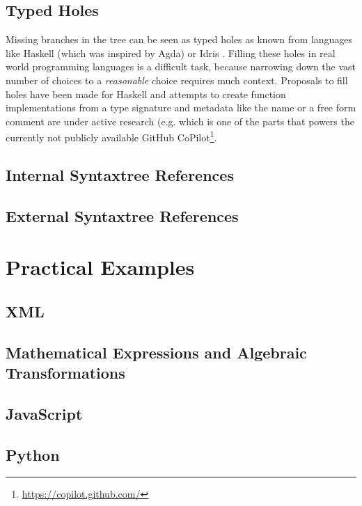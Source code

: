 \subsection{Typed Holes}

Missing branches in the tree can be seen as typed holes as known from languages like Haskell (which was inspired by Agda) \cite{jones_haskell_2014} or Idris \cite{brady_type-driven_2017}. Filling these holes in real world programming languages is a difficult task, because narrowing down the vast number of choices to a \textit{reasonable} choice requires much context. Proposals to fill holes have been made for Haskell \cite{gissurarson_suggesting_2018} and attempts to create function implementations from a type signature and metadata like the name or a free form comment are under active research (e.g. \cite{chen_evaluating_2021} which is one of the parts that powers the currently not publicly available GitHub CoPilot\footnote{\url{https://copilot.github.com/}}.

\subsection{Internal Syntaxtree References}

\subsection{External Syntaxtree References}

\section{Practical Examples}

\subsection{XML}

\subsection{Mathematical Expressions and Algebraic Transformations}

\subsection{JavaScript}

\subsection{Python}

